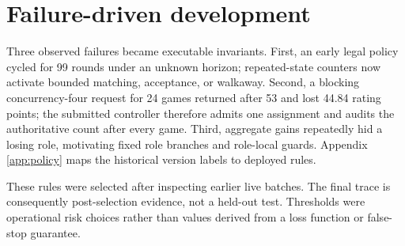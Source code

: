 \section{Failure-driven development}

Three observed failures became executable invariants. First, an early legal
policy cycled for 99 rounds under an unknown horizon; repeated-state counters
now activate bounded matching, acceptance, or walkaway. Second, a blocking
concurrency-four request for 24 games returned after 53 and lost 44.84 rating
points; the submitted controller therefore admits one assignment and audits the
authoritative count after every game. Third, aggregate gains repeatedly hid a
losing role, motivating fixed role branches and role-local guards. Appendix~
\ref{app:policy} maps the historical version labels to deployed rules.

These rules were selected after inspecting earlier live batches. The final
trace is consequently post-selection evidence, not a held-out test. Thresholds
were operational risk choices rather than values derived from a loss function
or false-stop guarantee.
